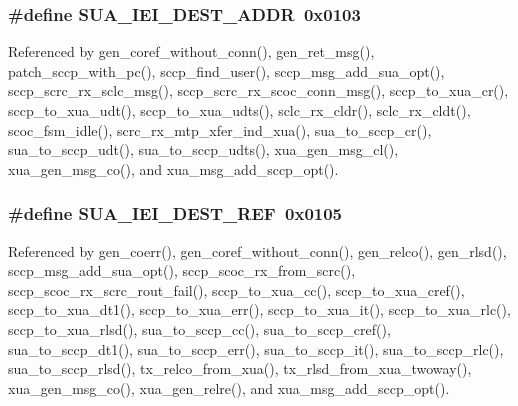 \subsubsection[{S\+U\+A\+\_\+\+I\+E\+I\+\_\+\+D\+E\+S\+T\+\_\+\+A\+D\+DR}]{\setlength{\rightskip}{0pt plus 5cm}\#define S\+U\+A\+\_\+\+I\+E\+I\+\_\+\+D\+E\+S\+T\+\_\+\+A\+D\+DR~0x0103}\label{sua_8h_a0d86b8c0ad8c4d92b4b65c166be3a607}


Referenced by gen\+\_\+coref\+\_\+without\+\_\+conn(), gen\+\_\+ret\+\_\+msg(), patch\+\_\+sccp\+\_\+with\+\_\+pc(), sccp\+\_\+find\+\_\+user(), sccp\+\_\+msg\+\_\+add\+\_\+sua\+\_\+opt(), sccp\+\_\+scrc\+\_\+rx\+\_\+sclc\+\_\+msg(), sccp\+\_\+scrc\+\_\+rx\+\_\+scoc\+\_\+conn\+\_\+msg(), sccp\+\_\+to\+\_\+xua\+\_\+cr(), sccp\+\_\+to\+\_\+xua\+\_\+udt(), sccp\+\_\+to\+\_\+xua\+\_\+udts(), sclc\+\_\+rx\+\_\+cldr(), sclc\+\_\+rx\+\_\+cldt(), scoc\+\_\+fsm\+\_\+idle(), scrc\+\_\+rx\+\_\+mtp\+\_\+xfer\+\_\+ind\+\_\+xua(), sua\+\_\+to\+\_\+sccp\+\_\+cr(), sua\+\_\+to\+\_\+sccp\+\_\+udt(), sua\+\_\+to\+\_\+sccp\+\_\+udts(), xua\+\_\+gen\+\_\+msg\+\_\+cl(), xua\+\_\+gen\+\_\+msg\+\_\+co(), and xua\+\_\+msg\+\_\+add\+\_\+sccp\+\_\+opt().

\subsubsection[{S\+U\+A\+\_\+\+I\+E\+I\+\_\+\+D\+E\+S\+T\+\_\+\+R\+EF}]{\setlength{\rightskip}{0pt plus 5cm}\#define S\+U\+A\+\_\+\+I\+E\+I\+\_\+\+D\+E\+S\+T\+\_\+\+R\+EF~0x0105}\label{sua_8h_a6401538917bb582b9e441fcc85c90fcb}


Referenced by gen\+\_\+coerr(), gen\+\_\+coref\+\_\+without\+\_\+conn(), gen\+\_\+relco(), gen\+\_\+rlsd(), sccp\+\_\+msg\+\_\+add\+\_\+sua\+\_\+opt(), sccp\+\_\+scoc\+\_\+rx\+\_\+from\+\_\+scrc(), sccp\+\_\+scoc\+\_\+rx\+\_\+scrc\+\_\+rout\+\_\+fail(), sccp\+\_\+to\+\_\+xua\+\_\+cc(), sccp\+\_\+to\+\_\+xua\+\_\+cref(), sccp\+\_\+to\+\_\+xua\+\_\+dt1(), sccp\+\_\+to\+\_\+xua\+\_\+err(), sccp\+\_\+to\+\_\+xua\+\_\+it(), sccp\+\_\+to\+\_\+xua\+\_\+rlc(), sccp\+\_\+to\+\_\+xua\+\_\+rlsd(), sua\+\_\+to\+\_\+sccp\+\_\+cc(), sua\+\_\+to\+\_\+sccp\+\_\+cref(), sua\+\_\+to\+\_\+sccp\+\_\+dt1(), sua\+\_\+to\+\_\+sccp\+\_\+err(), sua\+\_\+to\+\_\+sccp\+\_\+it(), sua\+\_\+to\+\_\+sccp\+\_\+rlc(), sua\+\_\+to\+\_\+sccp\+\_\+rlsd(), tx\+\_\+relco\+\_\+from\+\_\+xua(), tx\+\_\+rlsd\+\_\+from\+\_\+xua\+\_\+twoway(), xua\+\_\+gen\+\_\+msg\+\_\+co(), xua\+\_\+gen\+\_\+relre(), and xua\+\_\+msg\+\_\+add\+\_\+sccp\+\_\+opt().

